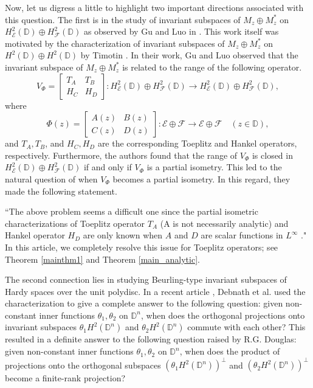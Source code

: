 \documentclass[12pt]{amsart}
\theoremstyle{definition}
\newcommand{\D}{\mathbb{D}}
\newcommand{\1}{{\mbox{\bf 1}}}
\newcommand{\cle}{\mathcal{E}}
\newcommand{\clf}{\mathcal{F}}
\newcommand{\raro}{\rightarrow}
\begin{document}
Now, let us digress a little to highlight two important directions associated with this question. The first is in the study of invariant subspaces of $M_z \oplus M_z^*$ on $H_{\cle}^2(\D) \oplus H_{\clf}^2(\D)$ as observed by Gu and Luo in \cite{GL}. This work itself was motivated by the characterization of invariant subspaces of $M_z \oplus M_z^*$ on $H^2(\D) \oplus H^2(\D)$ by Timotin \cite{Timotin}. In their work, Gu and Luo observed that the invariant subspace of $M_z \oplus M_z^*$ is related to the range of the following operator.
\[
V_{\Phi} = \begin{bmatrix}
T_A & T_B\\
H_C & H_D
\end{bmatrix}: H_{\cle}^2(\D) \oplus H_{\clf}^2(\D) \raro H_{\cle}^2(\D) \oplus H_{\clf}^2(\D),
\]
where 
\[
\Phi(z) = \begin{bmatrix}
A(z) & B(z)\\ 
C(z) & D(z)
\end{bmatrix}: \cle \oplus \clf  \raro \cle \oplus \clf \quad (z \in \D),
\]
and $T_A, T_B$, and $H_C, H_D$ are the corresponding Toeplitz and Hankel operators, respectively.  Furthermore, the authors found that the range of $V_{\Phi}$ is closed in $H_{\cle}^2(\D) \oplus H_{\clf}^2(\D)$ if and only if $V_{\Phi}$ is a partial isometry. This led to the natural question of when $V_{\Phi}$ becomes a partial isometry. In this regard, they made the following statement.

``The above problem seems a difficult one since the partial isometric characterizations
of Toeplitz operator $T_A$ (A is not necessarily analytic) and Hankel operator $H_D$ are only known when $A$ and $D$ are scalar functions in $L^{\infty}$ \cite{BD, Peller}." In this article, we completely resolve this issue for Toeplitz operators; see Theorem \ref{mainthm1} and Theorem \ref{main_analytic}. 

The second connection lies in studying Beurling-type invariant subspaces of Hardy spaces over the unit polydisc. In a recent article \cite{DPS},  Debnath et al. used the characterization \cite[Theorem 1.1]{KPS} to give a complete answer to the following question: given non-constant inner functions $\theta_1, \theta_2$ on $\D^n$, when does the orthogonal projections onto invariant subspaces $\theta_1 H^2(\D^n)$ and $\theta_2 H^2(\D^n)$ commute with each other? This resulted in a definite answer to the following question raised by R.G. Douglas:  given non-constant inner functions $\theta_1, \theta_2$ on $\D^n$, when does the product of projections onto the orthogonal subspaces $(\theta_1 H^2(\D^n))^{\perp}$ and $(\theta_2 H^2(\D^n))^{\perp}$ become a finite-rank projection?
\end{document}
